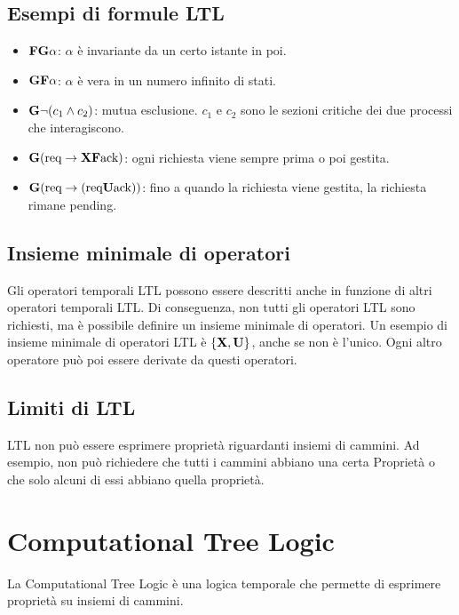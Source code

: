 \subsection{Esempi di formule LTL}
\begin{itemize}
    \item $\textnormal{\textbf{F}} \textnormal{\textbf{G}} \alpha$: $\alpha$ è invariante da un certo
    istante in poi.
    \item $\textnormal{\textbf{G}} \textnormal{\textbf{F}} \alpha$: $\alpha$ è vera in un numero
    infinito di stati.
    \item $\textnormal{\textbf{G}} \lnot (c_1 \land c_2)$: mutua esclusione. $c_1$ e
    $c_2$ sono le sezioni critiche dei due processi che interagiscono.
    \item $\textnormal{\textbf{G}} (\text{req} \rightarrow \textnormal{\textbf{X}} \textnormal{\textbf{F}} \text{ack})$:
    ogni richiesta viene sempre prima o poi gestita.
    \item $\textnormal{\textbf{G}} (\text{req} \rightarrow (\text{req} \textnormal{\textbf{U}} \text{ack}))$:
    fino a quando la richiesta viene gestita, la richiesta rimane pending.
\end{itemize}

\subsection{Insieme minimale di operatori}
Gli operatori temporali LTL possono essere descritti anche in funzione
di altri operatori temporali LTL.
Di conseguenza, non tutti gli operatori LTL sono richiesti, ma è possibile
definire un insieme minimale di operatori.
Un esempio di insieme minimale di operatori LTL è $\left\{\textnormal{\textbf{X}}, \textnormal{\textbf{U}}\right\}$,
anche se non è l'unico. Ogni altro operatore può poi essere derivate da
questi operatori.


\subsection{Limiti di LTL}
LTL non può essere esprimere proprietà riguardanti insiemi di cammini.
Ad esempio, non può richiedere che tutti i cammini abbiano una certa Proprietà
o che solo alcuni di essi abbiano quella proprietà.


\section{Computational Tree Logic}
La Computational Tree Logic è una logica temporale che permette di esprimere
proprietà su insiemi di cammini.

